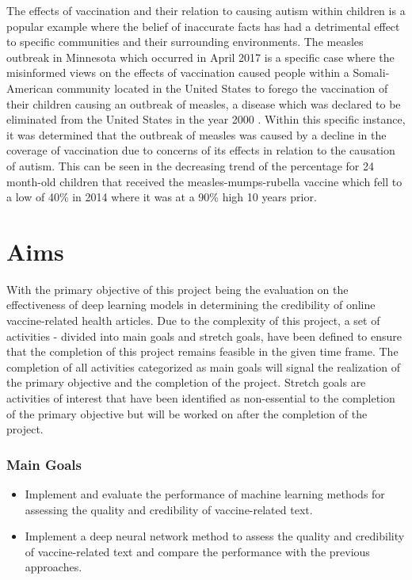 \documentclass[a4paper,twoside,phd]{BYUPhys}
\begin{document}
The effects of vaccination and their relation to causing autism within children is a popular example where the belief of inaccurate facts has had a detrimental effect to specific communities and their surrounding environments. The measles outbreak in Minnesota which occurred in April 2017 is a specific case where the misinformed views on the effects of vaccination caused people within a Somali-American community located in the United States to forego the vaccination of their children causing an outbreak of measles, a disease which was declared to be eliminated from the United States in the year 2000 \cite{Hall2017}. Within this specific instance, it was determined that the outbreak of measles was caused by a decline in the coverage of vaccination due to concerns of its effects in relation to the causation of autism. This can be seen in the decreasing trend of the percentage for 24 month-old children that received the measles-mumps-rubella vaccine which fell to a low of 40\% in 2014 where it was at a 90\% high 10 years prior.

\section{Aims}
\label{sec:Aims}

With the primary objective of this project being the evaluation on the effectiveness of deep learning models in determining the credibility of online vaccine-related health articles. Due to the complexity of this project, a set of activities - divided into main goals and stretch goals, have been defined to ensure that the completion of this project remains feasible in the given time frame. The completion of all activities categorized as main goals will signal the realization of the primary objective and the completion of the project. Stretch goals are activities of interest that have been identified as non-essential to the completion of the primary objective but will be worked on after the completion of the project.

\subsubsection{Main Goals}
\label{sec:MainGoals}
\begin{itemize}
	\item Implement and evaluate the performance of machine learning methods for assessing the quality and credibility of vaccine-related text.
	\item Implement a deep neural network method to assess the quality and credibility of vaccine-related text and compare the performance with the previous approaches.
\end{itemize}
\end{document}
